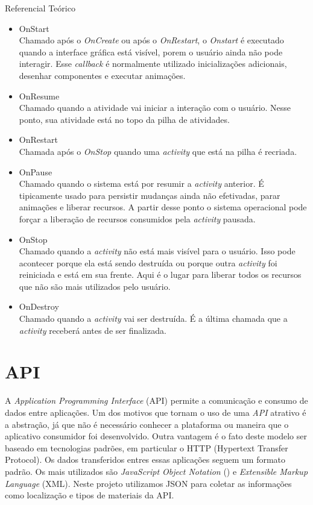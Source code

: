 \documentclass[
	12pt,				%
	openany,			%
	twoside,			%
	a4paper,			%
	english,			%
	french,				%
	spanish,			%
	brazil				%
	]{abntex2}
\begin{document}
\begin{chapter}{Referencial Teórico}
\begin{itemize}
     \newpage
     \item{OnStart} \\
     Chamado após o \textit{OnCreate} ou após o \textit{OnRestart}, o \textit{Onstart} é executado quando a interface gráfica está visível, porem o usuário ainda não pode interagir. Esse \textit{callback} é normalmente utilizado inicializações adicionais, desenhar componentes e executar animações.
     \item{OnResume} \\
      Chamado quando a atividade vai iniciar a interação com o usuário. Nesse ponto, sua atividade está no topo da pilha de atividades. 
      \item{OnRestart} \\
      Chamada após o \textit{OnStop} quando uma \textit{activity} que está na pilha é recriada. 
     \item{OnPause} \\
     Chamado quando o sistema está por resumir a \textit{activity} anterior. É tipicamente usado para persistir mudanças ainda não efetivadas, parar animações e liberar recursos. A partir desse ponto o sistema operacional pode forçar a liberação de recursos consumidos pela \textit{activity} pausada. 
     \item{OnStop} \\
    Chamado quando a \textit{activity} não está mais visível para o usuário. Isso pode acontecer porque ela está sendo destruída ou porque outra  \textit{activity} foi reiniciada e está em sua frente. Aqui é o lugar para liberar todos os recursos que não são mais utilizados pelo usuário. 
     \item{OnDestroy} \\
     Chamado quando a \textit{activity} vai ser destruída. É a última chamada que a \textit{activity} receberá antes de ser finalizada.
  \end{itemize}

\section{API} \label{API}
A \textit{Application Programming Interface} (API) permite a comunicação e consumo de dados entre aplicações. Um dos motivos que tornam o uso de uma \textit{API} atrativo é a abstração, já que não é necessário conhecer a plataforma ou maneira que o aplicativo consumidor foi desenvolvido. Outra vantagem é o fato deste modelo ser baseado em tecnologias padrões, em particular o HTTP (Hypertext Transfer Protocol). Os dados transferidos entres essas aplicações seguem um formato padrão. Os mais utilizados são \textit{JavaScript Object Notation} () e \textit{Extensible Markup Language} (XML). Neste projeto utilizamos JSON para coletar as informações como localização e tipos de materiais da API.


\end{chapter}
\end{document}
